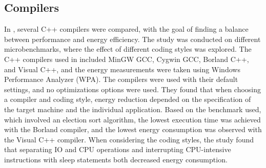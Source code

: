 \subsection{Compilers}
In \cite{hassan2017}, several C++ compilers were compared, with the goal of finding a balance between performance and energy efficiency. The study was conducted on different microbenchmarks, where the effect of different coding styles was explored.%
The C++ compilers used in \cite{hassan2017} included MinGW GCC, Cygwin GCC, Borland C++, and Visual C++, and the energy measurements were taken using Windows Performance Analyzer (WPA). The compilers were used with their default settings, and no optimizations options were used. %
They found that when choosing a compiler and coding style, energy reduction depended on the specification of the target machine and the individual application. Based on the benchmark used, which involved an election sort algorithm, the lowest execution time was achieved with the Borland compiler, and the lowest energy consumption was observed with the Visual C++ compiler. When considering the coding styles, the study found that separating IO and CPU operations and interrupting CPU-intensive instructions with sleep statements both decreased energy consumption.
